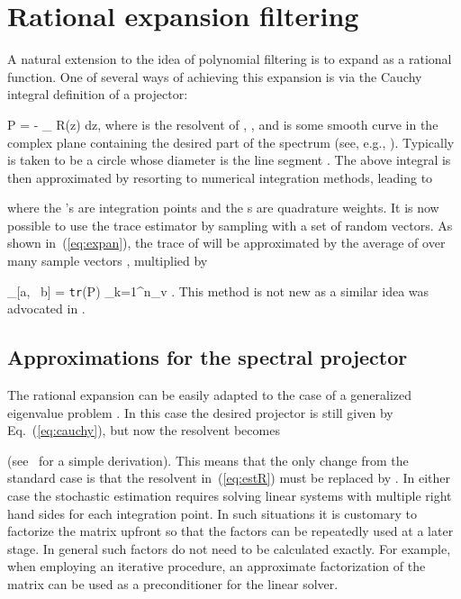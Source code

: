 \documentclass[12pt]{article}		\usepackage{tabls,multirow}
\def\trace{\mbox{\tt tr}}
\newcommand{\ab}{[a, \ b]}
\def\inv{^{-1}}\def\backw{{\bf B}}\def\diag{\mbox{Diag}\,}
\def\nref#1{(\ref{#1})}
\newcommand{\eq}[1]{}
\begin{document}
\section{Rational expansion filtering} 
\label{sec:rational}
A natural extension to the idea of polynomial filtering
is to expand  as a rational function. One of several ways
of achieving this expansion is via the Cauchy integral definition
of a projector: 
\eq{eq:cauchy}
P = -  \int_{\Gamma} R(z) dz, 
\en 
 where  is the resolvent of , , and  is some smooth curve in the complex plane
 containing the desired part of the spectrum (see, e.g.,
 \cite{Saad-book3}). Typically  is taken to be a circle
 whose diameter is the line segment .  The above integral is
 then approximated by resorting to numerical integration methods,
 leading to

where the 's are integration points and the s are quadrature
weights. 
It is now possible to use the trace estimator by sampling with 
a set of random vectors. As shown in~(\ref{eq:expan}), the trace of  will be 
approximated  by the average of  over many sample
vectors , multiplied by 
\eq{eq:estR}
\mu_{\ab} = \trace (P) \approx {} \sum_{k=1}^{n_v} 
\left[
\sum_{j=1}^{n_c} \omega_j v_k^T (A - z_j I)\inv v_k \right] . 
\en
This method is not new as 
a similar idea was advocated in \cite{FutamuraSakuraiEigCnt}.

\subsection{Approximations for the spectral projector} 
\label{sec:ratGen} 
The rational expansion can be easily adapted to the case of a
generalized eigenvalue problem .  In this case the
desired projector is still given by Eq.~\nref{eq:cauchy}, but now
the resolvent becomes
 
(see~\cite{Kramer-al-FEAST-2013} for a simple derivation). This means
that the only change from the standard case is that the resolvent
 in~(\ref{eq:estR}) must be replaced by . In either case the stochastic estimation requires solving linear
systems with multiple right hand sides for each integration point. In
such situations it is customary to factorize the matrix 
upfront so that the factors can be repeatedly used at a later
stage. In general such factors do not need to be calculated
exactly. For example, when employing an iterative procedure, an
approximate factorization of the matrix  can be used as a
preconditioner for the linear solver.
\end{document}
